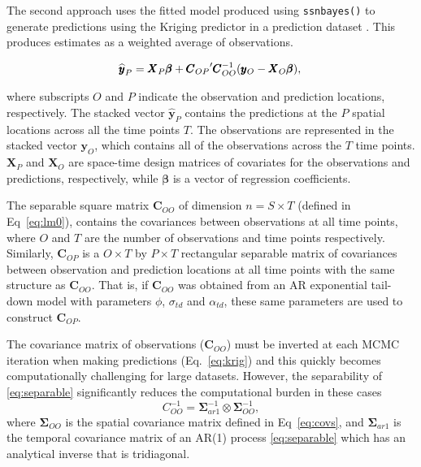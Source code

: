The second approach uses the fitted model produced using \texttt{ssnbayes()} to generate predictions using the Kriging predictor in a prediction dataset \citep{banerjee2014hierarchical, gelfand2019handbook}. This produces estimates as a weighted average of observations.

\begin{equation}
\widehat{\pmb{y}}_{P} = \pmb{X}_{P}\pmb{\beta} + {\pmb{C}_{OP}}'\pmb{C}^{-1}_{OO} (\pmb{y}_{O} - \pmb{X}_{O}\pmb{\beta} ),\\
\label{eq:krig}
\end{equation}

\noindent where subscripts $O$ and $P$ indicate the observation and prediction locations, respectively. The stacked vector $\widehat{\pmb{y}}_{P}$ contains the predictions at the $P$ spatial locations  across all the time points $T$. The observations are represented in the stacked vector $\pmb{y}_{O}$, which contains all of the observations across the $T$ time points. 
$\pmb{X}_{P}$ and $\pmb{X}_{O}$ are space-time design matrices of covariates for the observations and predictions, respectively, while $\pmb{\beta}$ is a vector of regression coefficients. 
 

The separable square matrix $\pmb{C}_{OO}$ of dimension $n = S \times T$ (defined in Eq~\ref{eq:lm0}), contains the covariances between observations at all time points, where $O$ and $T$ are the number of observations and time points respectively. Similarly,  $\pmb{C}_{OP}$ is a $O \times T$ by $P \times T$ rectangular separable matrix of covariances between observation and prediction locations at all time points with the same structure as $\pmb{C}_{OO}$. That is, if $\pmb{C}_{OO}$ was obtained from an AR exponential tail-down model with parameters $\phi$, $\sigma_{td}$ and $\alpha_{td}$, these same parameters are used to construct $\pmb{C}_{OP}$.

The covariance matrix of observations ($\pmb{C}_{OO}$) must be inverted at each MCMC iteration when making predictions (Eq.~\ref{eq:krig}) and this quickly becomes computationally challenging for large datasets. However, the separability of \eqref{eq:separable} significantly reduces the computational burden in these cases \citep{wikle2019spatio} 
$$C^{-1}_{OO} =\pmb{\Sigma}_{ar1}^{-1} \otimes\pmb{\Sigma}_{OO}^{-1}  ,$$
\noindent where $\pmb{\Sigma}_{OO}$ is the spatial covariance matrix defined in Eq~\ref{eq:covs}, and $\pmb{\Sigma}_{ar1}$ is the temporal covariance matrix of an AR(1) process \eqref{eq:separable} which has an analytical inverse that is tridiagonal.




